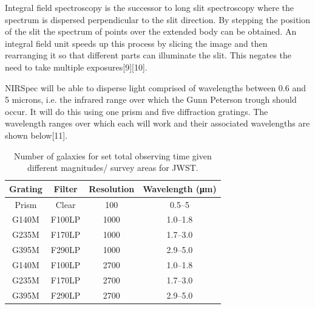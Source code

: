 			Integral field spectroscopy is the successor to long slit spectroscopy where the spectrum is dispersed perpendicular to the slit direction. By stepping the position of the slit the spectrum of points over the extended body can be obtained. An integral field unit speeds up this process by slicing the image and then rearranging it so that different parts can illuminate the slit. This negates the need to take multiple exposures\cite{}[9]\cite{}[10].

			NIRSpec will be able to disperse light comprised of wavelengths between 0.6 and 5 microns, i.e. the infrared range over which the Gunn Peterson trough should occur. It will do this using one prism and five diffraction gratings. The wavelength ranges over which each will work and their associated wavelengths are shown below\cite{}[11].
			\begin{table}[!htbp]
				\begin{center}
					\begin{tabular}{c|c|c|c}
						Grating & Filter & Resolution & Wavelength (\si{\micro\metre}) \\
						\hline \hline
						Prism & Clear & 100 & 0.5--5 \\
						G140M & F100LP & 1000 & 1.0--1.8 \\
						G235M & F170LP & 1000 & 1.7--3.0 \\
						G395M & F290LP & 1000 & 2.9--5.0 \\
						G140M & F100LP & 2700 & 1.0--1.8 \\
						G235M & F170LP & 2700 & 1.7--3.0 \\
						G395M & F290LP & 2700 & 2.9--5.0
					\end{tabular}
				\end{center}
				\caption{Number of galaxies for set total observing time given different magnitudes/ survey areas for JWST.\label{tab:galaxies_for_set_total_observing_time_JWST}}
			\end{table}

